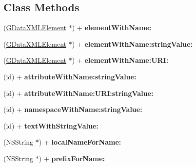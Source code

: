 \subsection*{Class Methods}
\begin{DoxyCompactItemize}
\item 
\hypertarget{interface_g_data_x_m_l_node_ad7e4405c6195d993a5633faa1899c8a0}{(\hyperlink{interface_g_data_x_m_l_element}{G\+Data\+X\+M\+L\+Element} $\ast$) + {\bfseries element\+With\+Name\+:}}\label{interface_g_data_x_m_l_node_ad7e4405c6195d993a5633faa1899c8a0}

\item 
\hypertarget{interface_g_data_x_m_l_node_ad8afb69afa7b083627e8a6db5eba45f7}{(\hyperlink{interface_g_data_x_m_l_element}{G\+Data\+X\+M\+L\+Element} $\ast$) + {\bfseries element\+With\+Name\+:string\+Value\+:}}\label{interface_g_data_x_m_l_node_ad8afb69afa7b083627e8a6db5eba45f7}

\item 
\hypertarget{interface_g_data_x_m_l_node_ae1241290bcd76d378ba9a5eb0612b6c4}{(\hyperlink{interface_g_data_x_m_l_element}{G\+Data\+X\+M\+L\+Element} $\ast$) + {\bfseries element\+With\+Name\+:\+U\+R\+I\+:}}\label{interface_g_data_x_m_l_node_ae1241290bcd76d378ba9a5eb0612b6c4}

\item 
\hypertarget{interface_g_data_x_m_l_node_abd922c9940730a4f78c906c2392123df}{(id) + {\bfseries attribute\+With\+Name\+:string\+Value\+:}}\label{interface_g_data_x_m_l_node_abd922c9940730a4f78c906c2392123df}

\item 
\hypertarget{interface_g_data_x_m_l_node_a82060803e76687ce902f09c96f654ab2}{(id) + {\bfseries attribute\+With\+Name\+:\+U\+R\+I\+:string\+Value\+:}}\label{interface_g_data_x_m_l_node_a82060803e76687ce902f09c96f654ab2}

\item 
\hypertarget{interface_g_data_x_m_l_node_a59cd9e673bcf2be9ed19ebbabc68ad26}{(id) + {\bfseries namespace\+With\+Name\+:string\+Value\+:}}\label{interface_g_data_x_m_l_node_a59cd9e673bcf2be9ed19ebbabc68ad26}

\item 
\hypertarget{interface_g_data_x_m_l_node_a13761fd3b75c6f465800e2d4ae45db84}{(id) + {\bfseries text\+With\+String\+Value\+:}}\label{interface_g_data_x_m_l_node_a13761fd3b75c6f465800e2d4ae45db84}

\item 
\hypertarget{interface_g_data_x_m_l_node_abaa7cb3204ca104a89895f895728b942}{(N\+S\+String $\ast$) + {\bfseries local\+Name\+For\+Name\+:}}\label{interface_g_data_x_m_l_node_abaa7cb3204ca104a89895f895728b942}

\item 
\hypertarget{interface_g_data_x_m_l_node_ad6038ded1bfe166d7c87718dde7a466f}{(N\+S\+String $\ast$) + {\bfseries prefix\+For\+Name\+:}}\label{interface_g_data_x_m_l_node_ad6038ded1bfe166d7c87718dde7a466f}

\end{DoxyCompactItemize}
